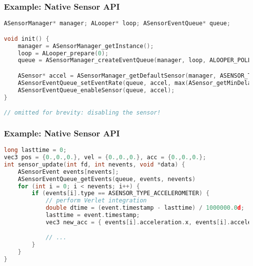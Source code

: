 \documentclass[10pt,mathserif]{beamer}
\begin{document}
	\begin{frame}[fragile]
		\frametitle{Example: Native Sensor API}



		\begin{lstlisting}[language=c]
ASensorManager* manager; ALooper* loop; ASensorEventQueue* queue;

void init() {
	manager = ASensorManager_getInstance();
	loop = ALooper_prepare(0);
	queue = ASensorManager_createEventQueue(manager, loop, ALOOPER_POLL_CALLBACK, sensor_update, NULL);

	ASensor* accel = ASensorManager_getDefaultSensor(manager, ASENSOR_TYPE_ACCELEROMETER);
	ASensorEventQueue_setEventRate(queue, accel, max(ASensor_getMinDelay(accel), 500));  // 500 us min
	ASensorEventQueue_enableSensor(queue, accel);
}

// omitted for brevity: disabling the sensor!
		\end{lstlisting}
	\end{frame}


	\begin{frame}[fragile]
		\frametitle{Example: Native Sensor API}

		\begin{lstlisting}[language=c]
long lasttime = 0;
vec3 pos = {0.,0.,0.}, vel = {0.,0.,0.}, acc = {0.,0.,0.};
int sensor_update(int fd, int nevents, void *data) {
	ASensorEvent events[nevents];
	ASensorEventQueue_getEvents(queue, events, nevents)
	for (int i = 0; i < nevents; i++) {
		if (events[i].type == ASENSOR_TYPE_ACCELEROMETER) {
			// perform Verlet integration
			double dtime = (event.timestamp - lasttime) / 1000000.0d;
			lasttime = event.timestamp;
			vec3 new_acc = { events[i].acceleration.x, events[i].acceleration.y, events[i].acceleration.z };

			// ...
		}
	}
}
		\end{lstlisting}
	\end{frame}
\end{document}
